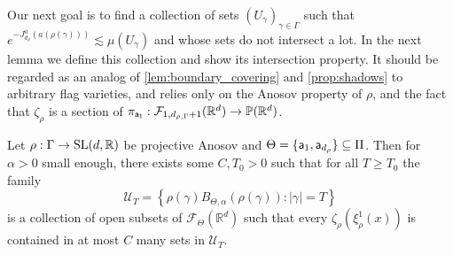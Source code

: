 \documentclass{report}
\begin{document}
Our next goal is to find a collection of sets $(U_\gamma)_{\gamma \in \Gamma}$ such that $e^{-J^u_{d_\rho}(a(\rho(\gamma)))} \lesssim \mu(U_\gamma)$ and whose sets do not intersect a lot.
In the next lemma we define this collection and show its intersection property.
It should be regarded as an analog of \cref{lem:boundary_covering} and \cref{prop:shadows} to arbitrary flag varieties, and relies only on the Anosov property of $\rho$, and the fact that $\zeta_\rho$ is a section of $\pi_{\sf a_1}: \mathcal F_{1, d_{\rho,\Gamma}+1}(\mathbb R^d) \to \mathbb P(\mathbb R^d)$.
\begin{lemma}\label{lem:boundary_covering_higher}
Let $\rho: \Gamma \to \operatorname{{\mathrm{SL}}}(d, \mathbb R)$ be projective Anosov and $\Theta = \{ {\sf a}_1, {\sf a}_{d_{\rho}}\} \subseteq \Pi$.
Then for $\alpha > 0$ small enough, there exists some $C, T_0 > 0$ such that for all $T \geq T_0$ the family
\[
    \mathcal U_T = \left\{ \rho(\gamma) B_{\Theta, \alpha}(\rho(\gamma)) : |\gamma| = T \right\}
\]
is a collection of open subsets of $\mathcal F_\Theta(\mathbb R^d)$ such that every $\zeta_\rho(\xi^1_\rho(x))$ is contained in at most $C$ many sets in $\mathcal U_T$.
\end{lemma}
\end{document}
